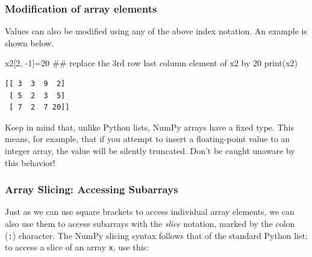 \documentclass[
  letterpaper,
  DIV=11,
  numbers=noendperiod]{scrreprt}
\newenvironment{Shaded}{\begin{snugshade}}{\end{snugshade}}
\newcommand{\BuiltInTok}[1]{\textcolor[rgb]{0.00,0.23,0.31}{#1}}
\newcommand{\CommentTok}[1]{\textcolor[rgb]{0.37,0.37,0.37}{#1}}
\newcommand{\DecValTok}[1]{\textcolor[rgb]{0.68,0.00,0.00}{#1}}
\newcommand{\NormalTok}[1]{\textcolor[rgb]{0.00,0.23,0.31}{#1}}
\newcommand{\OperatorTok}[1]{\textcolor[rgb]{0.37,0.37,0.37}{#1}}
\theoremstyle{plain}
\theoremstyle{definition}
\theoremstyle{remark}
\begin{document}
\subsubsection{Modification of array
elements}\label{modification-of-array-elements}

Values can also be modified using any of the above index notation. An
example is shown below.

\begin{Shaded}
\begin{Highlighting}[]
\NormalTok{x2[}\DecValTok{2}\NormalTok{, }\OperatorTok{{-}}\DecValTok{1}\NormalTok{]}\OperatorTok{=}\DecValTok{20} \CommentTok{\#\# replace the 3rd row last column element of x2 by 20}
\BuiltInTok{print}\NormalTok{(x2)}
\end{Highlighting}
\end{Shaded}

\begin{verbatim}
[[ 3  3  9  2]
 [ 5  2  3  5]
 [ 7  2  7 20]]
\end{verbatim}

\begin{tcolorbox}[enhanced jigsaw, leftrule=.75mm, bottomtitle=1mm, colback=white, toptitle=1mm, opacitybacktitle=0.6, toprule=.15mm, colbacktitle=quarto-callout-note-color!10!white, arc=.35mm, colframe=quarto-callout-note-color-frame, title=\textcolor{quarto-callout-note-color}{\faInfo}\hspace{0.5em}{Homogenity of data in \texttt{NumPy} arrays}, titlerule=0mm, rightrule=.15mm, left=2mm, bottomrule=.15mm, breakable, coltitle=black, opacityback=0]

Keep in mind that, unlike Python lists, NumPy arrays have a fixed type.
This means, for example, that if you attempt to insert a floating-point
value to an integer array, the value will be silently truncated. Don't
be caught unaware by this behavior!

\end{tcolorbox}

\subsubsection{Array Slicing: Accessing
Subarrays}\label{array-slicing-accessing-subarrays}

Just as we can use square brackets to access individual array elements,
we can also use them to access subarrays with the \emph{slice} notation,
marked by the colon (\texttt{:}) character. The NumPy slicing syntax
follows that of the standard Python list; to access a slice of an array
\texttt{x}, use this:
\end{document}
